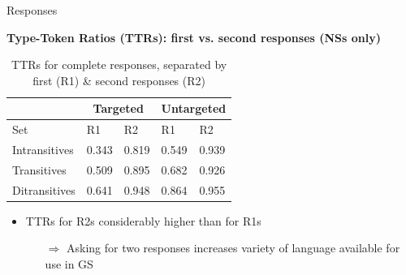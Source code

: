 \documentclass[final,14pt,t]{beamer}
\begin{document}
\begin{frame}{}
\begin{columns}[t]
\begin{column}{.33\linewidth}
\begin{minipage}[t][\textheight]{\linewidth}
\begin{block}{Responses}
\begin{center}
\begin{minipage}{.85\textwidth}
\vspace{1.3em}

\begin{center}
  \textbf{Type-Token Ratios (TTRs): first vs. second responses (NSs only)}
\end{center}

\begin{table}[hb!]
\begin{center}
\setlength{\tabcolsep}{0.65em}
\begin{tabular}{|l||l|l||l|l|}
\hline
 & \multicolumn{2}{|c||}{Targeted} & \multicolumn{2}{|c|}{Untargeted} \\
\hline
 Set & R1 & R2 & R1 & R2 \\
\hline
\hline
Intransitives & 0.343 & 0.819 & 0.549 & 0.939 \\
\hline
Transitives & 0.509 & 0.895 & 0.682 & 0.926 \\
\hline
Ditransitives & 0.641 & 0.948 & 0.864 & 0.955  \\ 
\hline
\end{tabular}
\caption{\label{tab:ttr1v2} TTRs for complete responses, separated by first (R1) \& second responses (R2)} %
\end{center}
\end{table}

\begin{itemize}
\item TTRs for R2s considerably higher than for R1s
  \begin{itemize}
  \vspace{.3em}
  \item[$\Rightarrow$] Asking for two responses increases variety of
    language available for use in GS
  \end{itemize}
\end{itemize}
\vspace{.5em}


\end{minipage}
\end{center}
\end{block}
\end{minipage}
\end{column}
\end{columns}
\end{frame}
\end{document}
